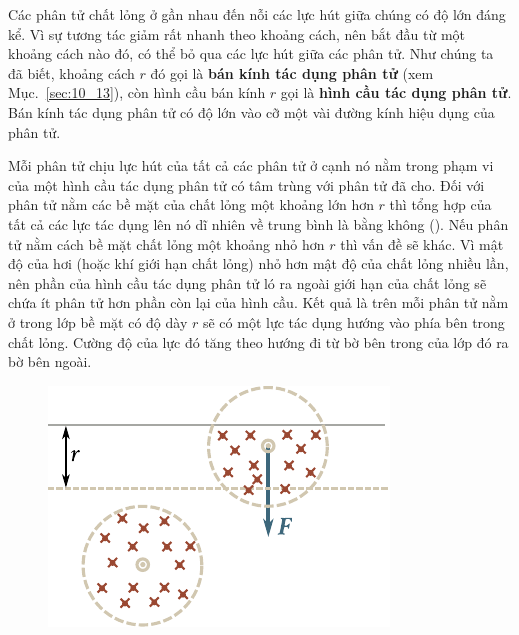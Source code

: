 Các phân tử chất lỏng ở gần nhau đến nỗi các lực hút giữa chúng có độ lớn đáng kể. Vì sự tương tác giảm rất nhanh theo khoảng cách, nên bắt đầu từ một khoảng cách nào đó, có thể bỏ qua các lực hút giữa các phân tử. Như chúng ta đã biết, khoảng cách $r$ đó gọi là \textbf{bán kính tác dụng phân tử} (xem Mục.~\ref{sec:10_13}), còn hình cầu bán kính $r$ gọi là \textbf{hình cầu tác dụng phân tử}. Bán kính tác dụng phân tử có độ lớn vào cỡ một vài đường kính hiệu dụng của phân tử.


Mỗi phân tử chịu lực hút của tất cả các phân tử ở cạnh nó nằm trong phạm vi của một hình cầu tác dụng phân tử có tâm trùng với phân tử đã cho. Đối với phân tử nằm các bề mặt của chất lỏng một khoảng lớn hơn $r$ thì tổng hợp của tất cả các lực tác dụng lên nó dĩ nhiên về trung bình là bằng không (). Nếu phân tử nằm cách bề mặt chất lỏng một khoảng nhỏ hơn $r$ thì vấn đề sẽ khác. Vì mật độ của hơi (hoặc khí giới hạn chất lỏng) nhỏ hơn mật độ của chất lỏng nhiều lần, nên phần của hình cầu tác dụng phân tử ló ra ngoài giới hạn của chất lỏng sẽ chứa ít phân tử hơn phần còn lại của hình cầu. Kết quả là trên mỗi phân tử nằm ở trong lớp bề mặt có độ dày $r$ sẽ có một lực tác dụng hướng vào phía bên trong chất lỏng. Cường độ của lực đó tăng theo hướng đi từ bờ bên trong của lớp đó ra bờ bên ngoài.

\begin{figure}[!htb]
	\begin{center}
		\includegraphics[scale=1.1]{figures/ch_14/fig_14_1.pdf}
		\caption[]{}
		\label{fig:14_1}
	\end{center}
	\vspace{-0.8cm}
\end{figure}

